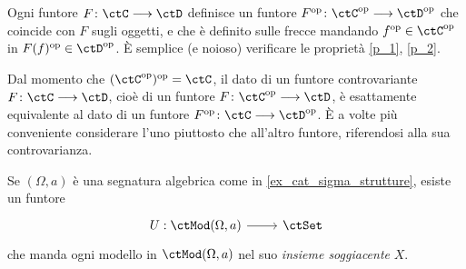 \begin{remark}
 Ogni funtore \(F \colon \ctC\fun\ctD\) definisce un funtore \(F^\op \colon \ctC^\op \fun\ctD^\op\) che coincide con \(F\) sugli oggetti, e che è definito sulle frecce mandando \(f^\op\in\ctC^\op\) in \(F(f)^\op\in\ctD^\op\). È semplice (e noioso) verificare le proprietà \ref{p_1}, \ref{p_2}.

 Dal momento che \((\ctC^\op)^\op = \ctC\), il dato di un funtore controvariante \(F \colon \ctC\fun\ctD\), cioè di un funtore \(F \colon \ctC^\op \fun\ctD\), è esattamente equivalente al dato di un funtore \(F^\op \colon \ctC \fun \ctD^\op\). È a volte più conveniente considerare l'uno piuttosto che all'altro funtore, riferendosi alla sua controvarianza.
\end{remark}
\begin{example}\label{exa_funtori_liberi_forgetti}
 Se \((\Omega,a)\) è una segnatura algebrica come in \ref{ex_cat_sigma_strutture}, esiste un funtore
 \[
  \begin{tikzcd}
   U : \ctMod(\Omega,a) \ar[r] & \ctSet
  \end{tikzcd}
 \]
 che manda ogni modello in \(\ctMod(\Omega,a)\) nel suo \emph{insieme soggiacente} \(X\).
\end{example}
